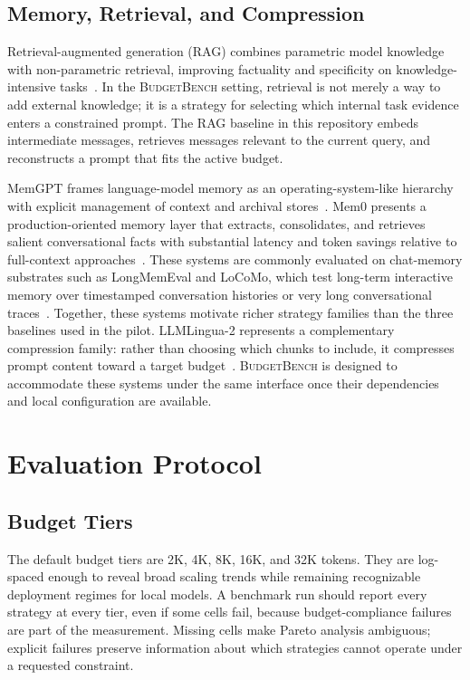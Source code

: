 \documentclass[11pt]{article}
\newcommand{\BudgetBench}{\textsc{BudgetBench}}
\begin{document}
\subsection{Memory, Retrieval, and Compression}

Retrieval-augmented generation (RAG) combines parametric model knowledge with
non-parametric retrieval, improving factuality and specificity on
knowledge-intensive tasks~\citep{lewis2020rag}.  In the \BudgetBench{} setting,
retrieval is not merely a way to add external knowledge; it is a strategy for
selecting which internal task evidence enters a constrained prompt.  The RAG
baseline in this repository embeds intermediate messages, retrieves messages
relevant to the current query, and reconstructs a prompt that fits the active
budget.

MemGPT frames language-model memory as an operating-system-like hierarchy with
explicit management of context and archival stores~\citep{packer2023memgpt}.
Mem0 presents a production-oriented memory layer that extracts, consolidates,
and retrieves salient conversational facts with substantial latency and token
savings relative to full-context approaches~\citep{chhikara2025mem0}.  These
systems are commonly evaluated on chat-memory substrates such as LongMemEval
and LoCoMo, which test long-term interactive memory over timestamped
conversation histories or very long conversational traces~\citep{wu2024longmemeval,maharana2024locomo}.  Together, these systems motivate richer
strategy families than the three baselines used in the
pilot.  LLMLingua-2 represents a complementary compression family: rather than
choosing which chunks to include, it compresses prompt content toward a target
budget~\citep{pan2024llmlingua2}.  \BudgetBench{} is designed to accommodate
these systems under the same interface once their dependencies and local
configuration are available.

\section{Evaluation Protocol}

\subsection{Budget Tiers}

The default budget tiers are 2K, 4K, 8K, 16K, and 32K tokens.  They are
log-spaced enough to reveal broad scaling trends while remaining recognizable
deployment regimes for local models.  A benchmark run should report every
strategy at every tier, even if some cells fail, because budget-compliance
failures are part of the measurement.  Missing cells make Pareto analysis
ambiguous; explicit failures preserve information about which strategies cannot
operate under a requested constraint.
\end{document}
